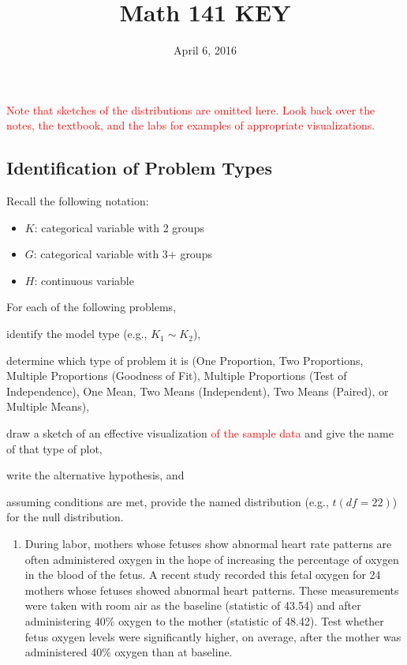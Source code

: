 \documentclass[]{article}
\title{Math 141 KEY}
\author{}
\date{April 6, 2016}
\providecommand{\tightlist}{%
  \setlength{\itemsep}{0pt}\setlength{\parskip}{0pt}}
\newenvironment{tight_enumerate}{ \begin{enumerate}[A)] \setlength{\itemsep}{0pt} \setlength{\parskip}{0pt}}{\end{enumerate}}
\begin{document}
\maketitle

\textcolor{red}{Note that sketches of the distributions are omitted here.  Look back over the notes, the textbook, and the labs for examples of appropriate visualizations.}

\subsection{Identification of Problem
Types}\label{identification-of-problem-types}

Recall the following notation:

\begin{itemize}
\tightlist
\item
  \(K\): categorical variable with 2 groups
\item
  \(G\): categorical variable with 3+ groups
\item
  \(H\): continuous variable
\end{itemize}

For each of the following problems,

\begin{tight_enumerate}
  \item identify the model type (e.g., $K_1 \sim K_2$),
  \item determine which type of problem it is (One Proportion, Two Proportions, Multiple Proportions (Goodness of Fit), Multiple Proportions (Test of Independence), One Mean, Two Means (Independent), Two Means (Paired), or Multiple Means),
  \item draw a sketch of an effective visualization \textcolor{red}{of the sample data} and give the name of that type of plot,
  \item write the alternative hypothesis, and
  \item assuming conditions are met, provide the named distribution (e.g., $t(df = 22)$) for the null distribution.
\end{tight_enumerate}

\begin{enumerate}
\def\labelenumi{\arabic{enumi}.}
\tightlist
\item
  During labor, mothers whose fetuses show abnormal heart rate patterns
  are often administered oxygen in the hope of increasing the percentage
  of oxygen in the blood of the fetus. A recent study recorded this
  fetal oxygen for 24 mothers whose fetuses showed abnormal heart
  patterns. These measurements were taken with room air as the baseline
  (statistic of 43.54) and after administering 40\% oxygen to the mother
  (statistic of 48.42). Test whether fetus oxygen levels were
  significantly higher, on average, after the mother was administered
  40\% oxygen than at baseline.
\end{enumerate}
\end{document}
